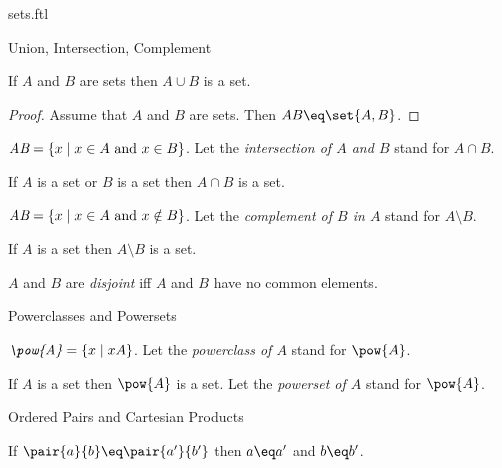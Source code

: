 \documentclass{naproche-library}
\begin{document}
\begin{smodule}[title=Classes and Sets]{sets.ftl}
\begin{sfragment}{Union, Intersection, Complement}
  \begin{proposition}[id=UnionProp]
    If $A$ and $B$ are sets then $A\cup B$ is a set.
  \end{proposition}
  \begin{proof}
    Assume that $A$ and $B$ are sets.
    Then $A\cup B\eq \bigcup\set{A,B}$.
  \end{proof}

  \begin{definition}[forthel,id=IntersectionDef]
    $\emph{A\cap B}=\{x\mid x\in A\text{ and }x\in B\}$.
    Let the \emph{intersection of $A$ and $B$} stand for $A\cap B$.
  \end{definition}

  \begin{proposition}[forthel,id=IntersectionProp]
    If $A$ is a set or $B$ is a set then $A\cap B$ is a set.
  \end{proposition}

  \begin{definition}[forthel,id=ComplementDef]
    $\emph{A\setminus B}=\{x\mid x\in A\text{ and }x\notin B\}$.
    Let the \emph{complement of $B$ in $A$} stand for $A\setminus B$.
  \end{definition}

  \begin{proposition}[forthel,id=ComplementProp]
    If $A$ is a set then $A\setminus B$ is a set.
  \end{proposition}

  \begin{definition}[forthel,id=DisjointDef]
    $A$ and $B$ are \emph{disjoint} iff $A$ and $B$ have no common elements.
  \end{definition}
\end{sfragment}

\begin{sfragment}{Powerclasses and Powersets}
  \begin{definition}[forthel,id=PowerclassDef]
    $\emph{\pow{A}}=\{x\mid x\subseteq A\}$.
    Let the \emph{powerclass of $A$} stand for $\pow{A}$.
  \end{definition}

  \begin{axiom}[forthel,title=Powerset Axiom,id=PowersetAx]
    If $A$ is a set then $\pow{A}$ is a set.
    Let the \emph{powerset of $A$} stand for $\pow{A}$.
  \end{axiom}
\end{sfragment}

\begin{sfragment}{Ordered Pairs and Cartesian Products}
  \begin{axiom}[forthel,title=Pair Extensionality Axiom,id=PairExtensionalityAx]
    If $\pair{a}{b}\eq \pair{a'}{b'}$ then $a\eq a'$ and $b\eq b'$.
  \end{axiom}


\end{sfragment}
\end{smodule}
\end{document}
